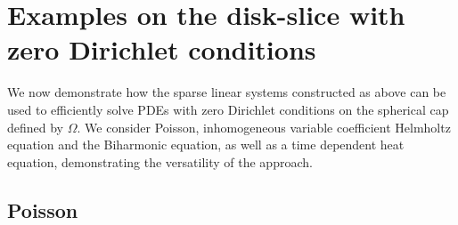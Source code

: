 \documentclass[11pt, oneside]{article}   	%
\begin{document}
%
\section{Examples on the disk-slice with zero Dirichlet conditions}\label{Section:Examples}

We now demonstrate how the sparse linear systems constructed as above can be used to efficiently solve PDEs with zero Dirichlet conditions on the spherical cap defined by $\Omega$. We consider Poisson, inhomogeneous variable coefficient Helmholtz equation and the Biharmonic equation, as well as a time dependent heat equation, demonstrating the versatility of the approach.

\subsection{Poisson}
\end{document}
